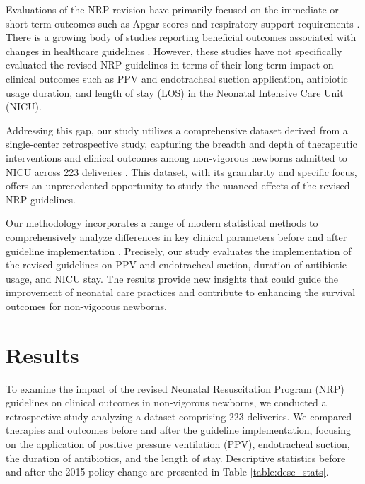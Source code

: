 \documentclass[11pt]{article}
\begin{document}
Evaluations of the NRP revision have primarily focused on the immediate or short-term outcomes such as Apgar scores and respiratory support requirements \cite{Myers2020ImpactOT}. There is a growing body of studies reporting beneficial outcomes associated with changes in healthcare guidelines \cite{Srenby2019ReducingRI,Goud2009EffectOG,Tapsell2017EffectOI}. However, these studies have not specifically evaluated the revised NRP guidelines in terms of their long-term impact on clinical outcomes such as PPV and endotracheal suction application, antibiotic usage duration, and length of stay (LOS) in the Neonatal Intensive Care Unit (NICU).

Addressing this gap, our study utilizes a comprehensive dataset derived from a single-center retrospective study, capturing the breadth and depth of therapeutic interventions and clinical outcomes among non-vigorous newborns admitted to NICU across 223 deliveries \cite{Chandrasekharan2020NeonatalRA, Johnson2020HeartRA}. This dataset, with its granularity and specific focus, offers an unprecedented opportunity to study the nuanced effects of the revised NRP guidelines.

Our methodology incorporates a range of modern statistical methods to comprehensively analyze differences in key clinical parameters before and after guideline implementation \cite{Rossi2021KnowledgeGE,VanderWeele2014OnTC}. Precisely, our study evaluates the implementation of the revised guidelines on PPV and endotracheal suction, duration of antibiotic usage, and NICU stay. The results provide new insights that could guide the improvement of neonatal care practices and contribute to enhancing the survival outcomes for non-vigorous newborns.

\section*{Results}

To examine the impact of the revised Neonatal Resuscitation Program (NRP) guidelines on clinical outcomes in non-vigorous newborns, we conducted a retrospective study analyzing a dataset comprising 223 deliveries. We compared therapies and outcomes before and after the guideline implementation, focusing on the application of positive pressure ventilation (PPV), endotracheal suction, the duration of antibiotics, and the length of stay. Descriptive statistics before and after the 2015 policy change are presented in Table \ref{table:desc_stats}.
\end{document}
